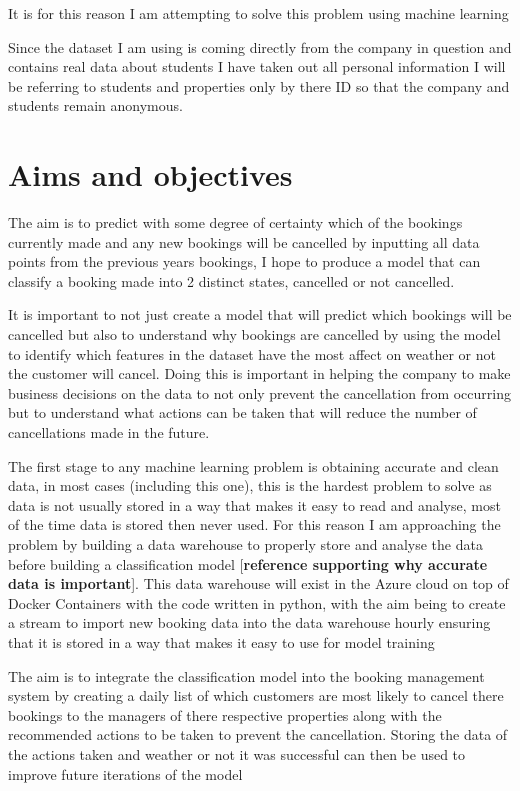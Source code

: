It is for this reason I am attempting to solve this problem using machine learning

Since the dataset I am using is coming directly from the company in question and contains real data about students I have taken out all personal information I will be referring to students and properties only by there ID so that the company and students remain anonymous. 
    
\section{Aims and objectives}
The aim is to predict with some degree of certainty which of the bookings currently made and any new bookings will be cancelled by inputting all data points from the previous years bookings, I hope to produce a model that can classify a booking made into 2 distinct states, cancelled or not cancelled.

It is important to not just create a model that will predict which bookings will be cancelled but also to understand why bookings are cancelled by using the model to identify which features in the dataset have the most affect on weather or not the customer will cancel. Doing this is important in helping the company to make business decisions on the data to not only prevent the cancellation from occurring but to understand what actions can be taken that will reduce the number of cancellations made in the future.  

The first stage to any machine learning problem is obtaining accurate and clean data, in most cases (including this one), this is the hardest problem to solve as data is not usually stored in a way that makes it easy to read and analyse, most of the time data is stored  then never used. For this reason I am approaching the problem by building a data warehouse to properly store and analyse the data before building a classification model [\textbf{reference supporting why accurate data is important}]. This data warehouse will exist in the Azure cloud on top of Docker Containers with the code written in python, with the aim being to create a stream to import new booking data into the data warehouse hourly ensuring that it is stored in a way that makes it easy to use for model training

The aim is to integrate the classification model into the booking management system by creating a daily list of which customers are most likely to cancel there bookings to the managers of there respective properties along with the recommended actions to be taken to prevent the cancellation. Storing the data of the actions taken and weather or not it was successful can then be used to improve future iterations of the model




